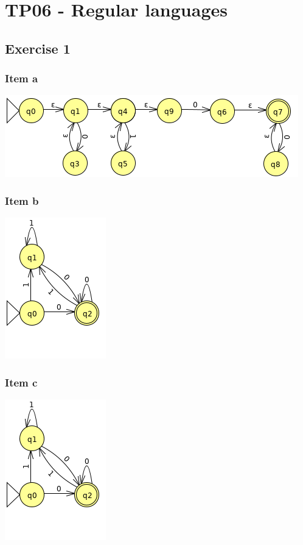 \setcounter{section}{5}
\section{TP06 - Regular languages}
{
\renewcommand{\thesubsubsection}{\thesubsection\alph{subsubsection}}
\subsection{Exercise 1}
\subsubsection{Item a}
\begin{center} \includegraphics[scale=0.5]{TP06_1_a} \end{center}
\subsubsection{Item b}
\begin{center} \includegraphics[scale=0.5]{TP06_1_b} \end{center}
\subsubsection{Item c}
\begin{center} \includegraphics[scale=0.5]{TP06_1_b} \end{center}
}
